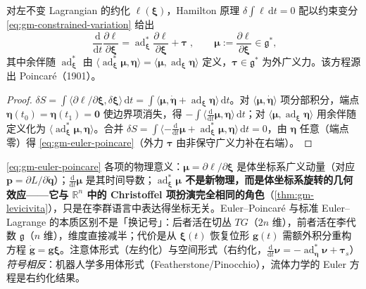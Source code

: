 \begin{theorem}\label{thm:gm-euler-poincare}
对左不变 Lagrangian 的约化 $\ell(\boldsymbol\xi)$，Hamilton 原理 $\delta\int\ell\,\mathrm dt=0$ 配以约束变分 \cref{eq:gm-constrained-variation} 给出
\begin{equation}
  \boxed{\;\frac{\mathrm d}{\mathrm dt}\frac{\partial\ell}{\partial\boldsymbol\xi}=\operatorname{ad}^*_{\boldsymbol\xi}\frac{\partial\ell}{\partial\boldsymbol\xi}+\boldsymbol\tau\;},\qquad \boldsymbol\mu:=\frac{\partial\ell}{\partial\boldsymbol\xi}\in\mathfrak g^*,
  \label{eq:gm-euler-poincare}
\end{equation}
其中余伴随 $\operatorname{ad}^*_{\boldsymbol\xi}$ 由 $\langle\operatorname{ad}^*_{\boldsymbol\xi}\boldsymbol\mu,\boldsymbol\eta\rangle=\langle\boldsymbol\mu,\operatorname{ad}_{\boldsymbol\xi}\boldsymbol\eta\rangle$ 定义，$\boldsymbol\tau\in\mathfrak g^*$ 为外广义力。该方程源出 Poincaré（1901）\cite{poincare1901forme}。
\end{theorem}

\begin{proof}
$\delta S=\int\langle\partial\ell/\partial\boldsymbol\xi,\delta\boldsymbol\xi\rangle\,\mathrm dt=\int\langle\boldsymbol\mu,\dot{\boldsymbol\eta}+\operatorname{ad}_{\boldsymbol\xi}\boldsymbol\eta\rangle\,\mathrm dt$。对 $\langle\boldsymbol\mu,\dot{\boldsymbol\eta}\rangle$ 项分部积分，端点 $\boldsymbol\eta(t_0)=\boldsymbol\eta(t_1)=\mathbf0$ 使边界项消失，得 $-\int\langle\tfrac{\mathrm d}{\mathrm dt}\boldsymbol\mu,\boldsymbol\eta\rangle\,\mathrm dt$；对 $\langle\boldsymbol\mu,\operatorname{ad}_{\boldsymbol\xi}\boldsymbol\eta\rangle$ 用余伴随定义化为 $\langle\operatorname{ad}^*_{\boldsymbol\xi}\boldsymbol\mu,\boldsymbol\eta\rangle$。合并 $\delta S=\int\langle-\tfrac{\mathrm d}{\mathrm dt}\boldsymbol\mu+\operatorname{ad}^*_{\boldsymbol\xi}\boldsymbol\mu,\boldsymbol\eta\rangle\,\mathrm dt=0$，由 $\boldsymbol\eta$ 任意（端点零）得 \cref{eq:gm-euler-poincare}（外力 $\boldsymbol\tau$ 由非保守广义力补在右端）。
\end{proof}

\begin{insight}
\cref{eq:gm-euler-poincare} 各项的物理意义：$\boldsymbol\mu=\partial\ell/\partial\boldsymbol\xi$ 是体坐标系广义动量（对应 $\mathbf p=\partial L/\partial\dot{\mathbf q}$）；$\tfrac{\mathrm d}{\mathrm dt}\boldsymbol\mu$ 是其时间导数；\textbf{$\operatorname{ad}^*_{\boldsymbol\xi}\boldsymbol\mu$ 不是新物理，而是体坐标系旋转的几何效应——它与 $\mathbb R^n$ 中的 Christoffel 项扮演完全相同的角色}（\cref{thm:gm-levicivita}），只是在李群语言中表达得坐标无关。Euler--Poincaré 与标准 Euler--Lagrange 的本质区别不是「换记号」：后者活在切丛 $TG$（$2n$ 维），前者活在李代数 $\mathfrak g$（$n$ 维），维度直接减半；代价是从 $\boldsymbol\xi(t)$ 恢复位形 $\mathbf g(t)$ 需额外积分重构方程 $\dot{\mathbf g}=\mathbf g\boldsymbol\xi$。注意体形式（左约化）与空间形式（右约化，$\tfrac{\mathrm d}{\mathrm dt}\boldsymbol\nu=-\operatorname{ad}^*_{\boldsymbol\eta}\boldsymbol\nu+\boldsymbol\tau_s$）\emph{符号相反}：机器人学多用体形式（Featherstone/Pinocchio），流体力学的 Euler 方程是右约化结果。
\end{insight}

